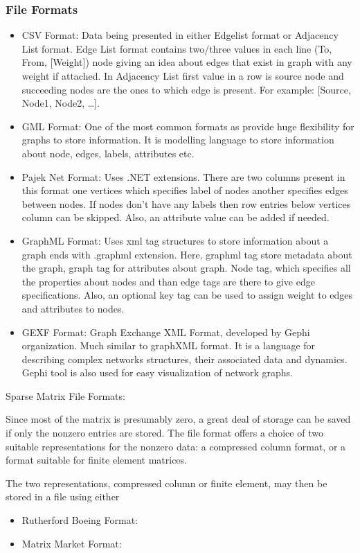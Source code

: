 \subsubsection{File Formats}
\begin{itemize}
    \item CSV Format: Data being presented in either Edgelist format or Adjacency List format. Edge List format contains two/three values in each line (To, From, [Weight]) node giving an idea about edges that exist in graph with any weight if attached. In Adjacency List first value in a row is source node and succeeding nodes are the ones to which edge is present. For example: [Source, Node1, Node2, …].
    \item GML Format: One of the most common formats as provide huge flexibility for graphs to store information. It is modelling language to store information about node, edges, labels, attributes etc.
    \item Pajek Net Format: Uses .NET extensions. There are two columns present in this format one vertices which specifies label of nodes another specifies edges between nodes. If nodes don’t have any labels then row entries below vertices column can be skipped. Also, an attribute value can be added if needed.
    \item GraphML Format: Uses xml tag structures to store information about a graph ends with .graphml extension. Here, graphml tag store metadata about the graph, graph tag for attributes about graph. Node tag, which specifies all the properties about nodes and than edge tags are there to give edge specifications. Also, an optional key tag can be used to assign weight to edges and attributes to nodes.
    \item GEXF Format: Graph Exchange XML Format, developed by Gephi organization. Much similar to graphXML format. It is a language for describing complex networks structures, their associated data and dynamics. Gephi tool is also used for easy visualization of network graphs.
\end{itemize}

\hrulefill

Sparse Matrix File Formats:

Since most of the matrix is presumably zero, a great deal of storage can be saved if only the nonzero entries are stored. The file format offers a choice of two suitable representations for the nonzero data: a compressed column format, or a format suitable for finite element matrices.

The two representations, compressed column or finite element, may then be stored in a file using either
\begin{itemize}
    \item Rutherford Boeing Format:
    \item Matrix Market Format:
\end{itemize}


